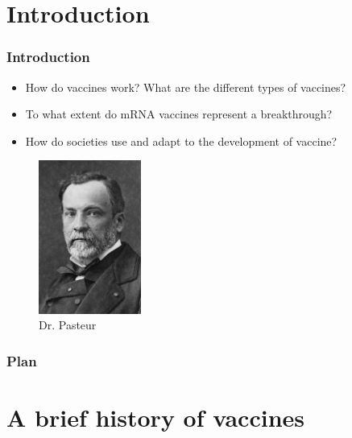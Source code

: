 \section*{Introduction}


\begin{frame}
    \frametitle{Introduction}
    \begin{itemize}
        \item How do vaccines work? What are the different types of vaccines?
        \item To what extent do mRNA vaccines represent a breakthrough?
        \item How do societies use and adapt to the development of vaccine?
    \end{itemize}

    \begin{figure}
        \centering
        \includegraphics[width=0.3\textwidth]{imgs/paster.jpg}
        \caption{Dr. Pasteur}
        \label{fig:responses4}
    \end{figure}

\end{frame}

\begin{frame}
    \frametitle{Plan} %
    \tableofcontents %
\end{frame}


\section{A brief history of vaccines}

